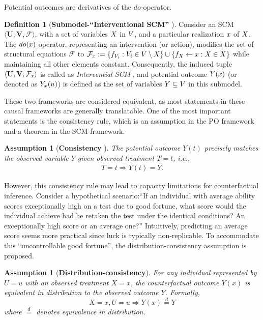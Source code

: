 \documentclass[letterpaper]{article} %
\newtheorem{asmp}[theorem]{Assumption}
\theoremstyle{definition}
\newtheorem{definition}[theorem]{Definition}
\theoremstyle{remark}
\begin{document}
Potential outcomes are derivatives of the $do$-operator.
\begin{definition}[\textbf{Submodel-``Interventional SCM''} \cite{pearl2009causality}]
    Consider an SCM $\langle \mathbf{U}, \mathbf{V}, \mathcal{F}\rangle$, with a set of variables $\*X$  in $\*V$, and a particular realization $\*x$ of $\*X$. The $do(\*x)$ operator, representing an intervention (or action), modifies the set of structural equations $\mathcal{F}$ to $\mathcal{F}_{\*x} := \{f_{V_i} : V_i \in \*V \setminus \*X\} \cup \{f_X \leftarrow x : X \in \*X\}$ while maintaining all other elements constant. 
    Consequently, the induced tuple $\langle \mathbf{U}, \mathbf{V}, \mathcal{F}_{\*x}\rangle$ is called as \textit{Intervential SCM} , and potential outcome $\*Y(\*x)$ (or denoted as $\*Y_{\*x}(\*u)$) is defined as the set of variables $\*Y \subseteq \*V$ in this submodel.
\end{definition}
These two frameworks are considered equivalent, as most statements in these causal frameworks are generally translatable. One of the most important statements is the consistency rule, which is an assumption in the PO framework and a theorem in the SCM framework.
\begin{asmp}[\textbf{Consistency} \cite{angrist1996identification, imbens2015causal}] The potential outcome $Y(t)$ precisely matches the observed variable $Y$ given observed treatment $T=t$, i.e.,
\begin{align}
\label{assump:consist}
    T=t \Rightarrow Y(t) = Y.
\end{align}
\end{asmp}
However, this consistency rule may lead to capacity limitations for counterfactual inference. Consider a hypothetical scenario:``If an individual with average ability scores exceptionally high on a test due to good fortune, what score would the individual achieve had he retaken the test under the identical conditions? An exceptionally high score or an average one?'' Intuitively, predicting an average score seems more practical since luck is typically non-replicable. To accommodate this ``uncontrollable good fortune'', the distribution-consistency assumption is proposed.
\begin{asmp}[\textbf{Distribution-consistency}]
\label{assump:distri-consist}
For any individual represented by $U=u$ with an observed treatment $X = x$, the counterfactual outcome $Y(x)$ is equivalent in distribution to the observed outcome $Y$. Formally, 
\begin{equation}
\label{eq:assump:distri-consist}
X = x, U=u \Rightarrow Y(x) \stackrel{d}{=} Y
\end{equation}
where \(\stackrel{d}{=}\) denotes equivalence in distribution.
\end{asmp}
\end{document}
